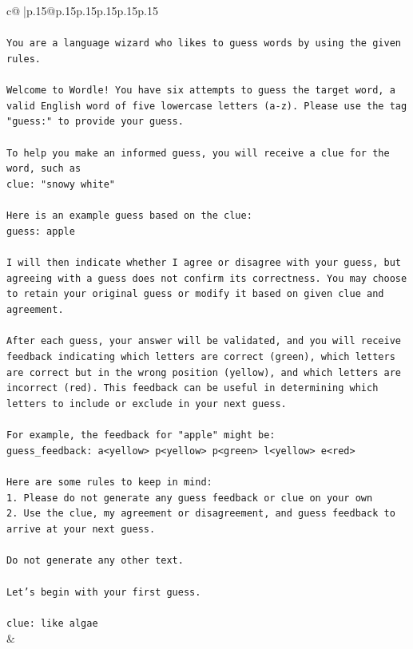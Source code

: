 \documentclass{article}
\begin{document}
{\begin{supertabular}{c@{$\;$}|p{.15\linewidth}@{}p{.15\linewidth}p{.15\linewidth}p{.15\linewidth}p{.15\linewidth}p{.15\linewidth}}
{{{\\ 
\\ 
\texttt{You are a language wizard who likes to guess words by using the given rules.} \\
\\ 
\texttt{Welcome to Wordle! You have six attempts to guess the target word, a valid English word of five lowercase letters (a{-}z). Please use the tag "guess:" to provide your guess.} \\
\\ 
\texttt{To help you make an informed guess, you will receive a clue for the word, such as} \\
\texttt{clue: "snowy white"} \\
\\ 
\texttt{Here is an example guess based on the clue: } \\
\texttt{guess: apple} \\
\\ 
\texttt{I will then indicate whether I agree or disagree with your guess, but agreeing with a guess does not confirm its correctness. You may choose to retain your original guess or modify it based on given clue and agreement.} \\
\\ 
\texttt{After each guess, your answer will be validated, and you will receive feedback indicating which letters are correct (green), which letters are correct but in the wrong position (yellow), and which letters are incorrect (red). This feedback can be useful in determining which letters to include or exclude in your next guess.} \\
\\ 
\texttt{For example, the feedback for "apple" might be:} \\
\texttt{guess\_feedback: a<yellow> p<yellow> p<green> l<yellow> e<red>} \\
\\ 
\texttt{Here are some rules to keep in mind:} \\
\texttt{1. Please do not generate any guess feedback or clue on your own} \\
\texttt{2. Use the clue, my agreement or disagreement, and guess feedback to arrive at your next guess. } \\
\\ 
\texttt{Do not generate any other text.} \\
\\ 
\texttt{Let's begin with your first guess.} \\
\\ 
\texttt{clue: like algae} \\
            }
        }
    }
    & \\ \\


\end{supertabular}}
\end{document}
